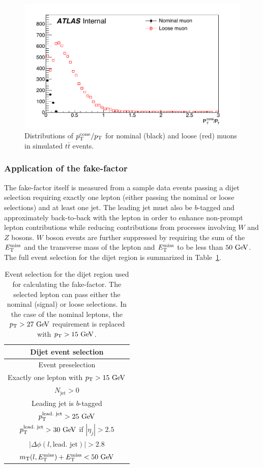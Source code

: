 \begin{figure}[htbp]
  \centering
  \includegraphics[width=.6\textwidth]{figs/ssww_13tev/backgrounds/ff/ptcone_muon_ttbar}
  \caption{Distributions of $p_{\mathrm{T}}^{\textrm{cone}}/p_{\mathrm{T}}$ for nominal (black) and loose (red) muons in simulated $t\bar{t}$ events.}
  \label{fig:ssww13tev_ff_ptcone_muons}
\end{figure}

%
\subsubsection{Application of the fake-factor}\label{ssww13tev:ff_implementation}
The fake-factor itself is measured from a sample data events passing a dijet selection requiring exactly one lepton (either passing the nominal or loose selections) and at least one jet.
The leading jet must also be $b$-tagged and approximately back-to-back with the lepton in order to enhance non-prompt lepton contributions while reducing contributions from processes involving $W$ and $Z$ bosons.
$W$ boson events are further suppressed by requiring the sum of the $E_{\mathrm{T}}^{\mathrm{miss}}$ and the transverse mass of the lepton and $E_{\mathrm{T}}^{\mathrm{miss}}$ to be less than $50\gev$.
The full event selection for the dijet region is summarized in Table~\ref{tab:ssww13tev_dijet_cr}.

\begin{table}[hbtp]
  \centering
  \begin{tabular}{c}
    Dijet event selection \\
    \hline\hline
    Event preselection\\
    Exactly one lepton with $\pt > 15\gev$\\
    $N_{\textrm{jet}} > 0$ \\
    Leading jet is $b$-tagged \\
    $\pt^{\textrm{lead.\ jet}} > 25\gev$\\
    $\pt^{\textrm{lead.\ jet}} > 30\gev$ if $|\eta_j| > 2.5$ \\
    $|\Delta\phi(l,\textrm{lead.\ jet})| > 2.8$ \\
    $m_{\textrm{T}}(l,\met) + \met < 50\gev$ \\
    \hline
  \end{tabular}
  \caption{Event selection for the dijet region used for calculating the fake-factor. The selected lepton can pass either the nominal (signal) or loose selections.  In the case of the nominal leptons, the $\pt > 27\gev$ requirement is replaced with $\pt > 15\gev$.}
  \label{tab:ssww13tev_dijet_cr}
\end{table}


